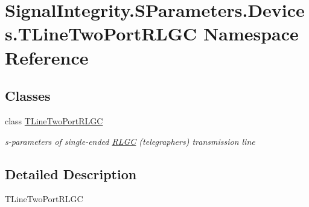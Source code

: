 \hypertarget{namespaceSignalIntegrity_1_1SParameters_1_1Devices_1_1TLineTwoPortRLGC}{}\section{Signal\+Integrity.\+S\+Parameters.\+Devices.\+T\+Line\+Two\+Port\+R\+L\+GC Namespace Reference}
\label{namespaceSignalIntegrity_1_1SParameters_1_1Devices_1_1TLineTwoPortRLGC}
\subsection*{Classes}
\begin{DoxyCompactItemize}
\item 
class \hyperlink{classSignalIntegrity_1_1SParameters_1_1Devices_1_1TLineTwoPortRLGC_1_1TLineTwoPortRLGC}{T\+Line\+Two\+Port\+R\+L\+GC}
\begin{DoxyCompactList}\small\item\em s-\/parameters of single-\/ended \hyperlink{namespaceSignalIntegrity_1_1SParameters_1_1RLGC}{R\+L\+GC} (telegraphers) transmission line \end{DoxyCompactList}\end{DoxyCompactItemize}


\subsection{Detailed Description}
\begin{DoxyVerb}TLineTwoPortRLGC\end{DoxyVerb}
 